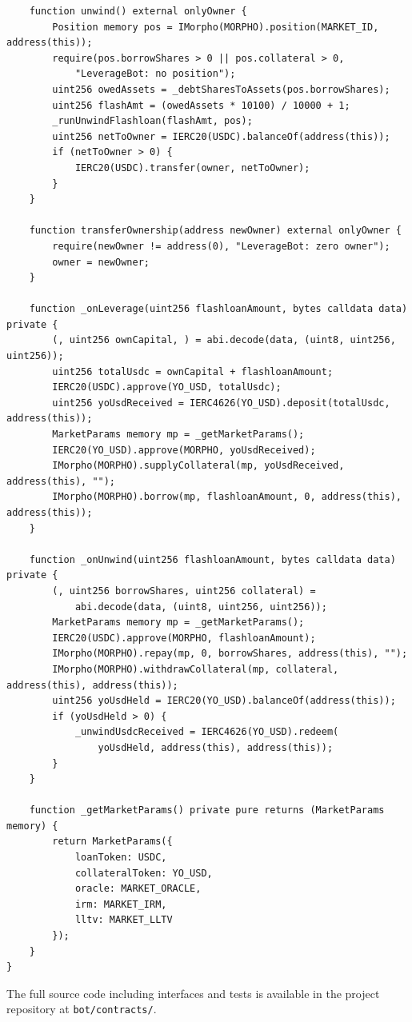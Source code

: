 \begin{verbatim}
    function unwind() external onlyOwner {
        Position memory pos = IMorpho(MORPHO).position(MARKET_ID, address(this));
        require(pos.borrowShares > 0 || pos.collateral > 0, 
            "LeverageBot: no position");
        uint256 owedAssets = _debtSharesToAssets(pos.borrowShares);
        uint256 flashAmt = (owedAssets * 10100) / 10000 + 1;
        _runUnwindFlashloan(flashAmt, pos);
        uint256 netToOwner = IERC20(USDC).balanceOf(address(this));
        if (netToOwner > 0) {
            IERC20(USDC).transfer(owner, netToOwner);
        }
    }

    function transferOwnership(address newOwner) external onlyOwner {
        require(newOwner != address(0), "LeverageBot: zero owner");
        owner = newOwner;
    }

    function _onLeverage(uint256 flashloanAmount, bytes calldata data) private {
        (, uint256 ownCapital, ) = abi.decode(data, (uint8, uint256, uint256));
        uint256 totalUsdc = ownCapital + flashloanAmount;
        IERC20(USDC).approve(YO_USD, totalUsdc);
        uint256 yoUsdReceived = IERC4626(YO_USD).deposit(totalUsdc, address(this));
        MarketParams memory mp = _getMarketParams();
        IERC20(YO_USD).approve(MORPHO, yoUsdReceived);
        IMorpho(MORPHO).supplyCollateral(mp, yoUsdReceived, address(this), "");
        IMorpho(MORPHO).borrow(mp, flashloanAmount, 0, address(this), address(this));
    }

    function _onUnwind(uint256 flashloanAmount, bytes calldata data) private {
        (, uint256 borrowShares, uint256 collateral) = 
            abi.decode(data, (uint8, uint256, uint256));
        MarketParams memory mp = _getMarketParams();
        IERC20(USDC).approve(MORPHO, flashloanAmount);
        IMorpho(MORPHO).repay(mp, 0, borrowShares, address(this), "");
        IMorpho(MORPHO).withdrawCollateral(mp, collateral, address(this), address(this));
        uint256 yoUsdHeld = IERC20(YO_USD).balanceOf(address(this));
        if (yoUsdHeld > 0) {
            _unwindUsdcReceived = IERC4626(YO_USD).redeem(
                yoUsdHeld, address(this), address(this));
        }
    }

    function _getMarketParams() private pure returns (MarketParams memory) {
        return MarketParams({
            loanToken: USDC,
            collateralToken: YO_USD,
            oracle: MARKET_ORACLE,
            irm: MARKET_IRM,
            lltv: MARKET_LLTV
        });
    }
}
\end{verbatim}

The full source code including interfaces and tests is available in the project repository at \texttt{bot/contracts/}.
